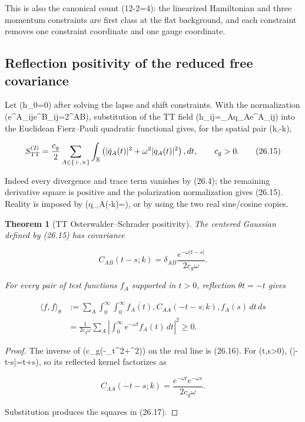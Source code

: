 \documentclass[11pt]{article}
\newtheorem{theorem}{Theorem}[section]
\theoremstyle{remark}
\begin{document}
This is also the canonical count
(12-2=4): the linearized Hamiltonian and three momentum
constraints are first class at the flat background, and each constraint
removes one constraint coordinate and one gauge coordinate.

\subsection{Reflection positivity of the reduced free covariance}

Let (h_{0\mu}=0) after solving the lapse and shift constraints.  With
the normalization (e^A_{ij}e^B_{ij}=2\delta^{AB}), substitution of the
TT field (h_{ij}=\sum_Aq_Ae^A_{ij}) into the Euclidean Fierz--Pauli
quadratic functional gives, for the spatial pair (k,-k),

\[
 S^{(2)}_{\rm TT}
 =\frac{c_g}{2}\sum_{A\in\{+,\times\}}
   \int_{\mathbb R}
   \left(|\dot q_A(t)|^2+\omega^2|q_A(t)|^2\right),dt,
 \qquad c_g>0.                                                \tag{26.15}
\]

Indeed every divergence and trace term vanishes by (26.4); the remaining
derivative square is positive and the polarization normalization gives
(26.15).  Reality is imposed by (q_A(-k)=), or by using
the two real sine/cosine copies.

\begin{theorem}[TT Osterwalder--Schrader positivity]
\label{thm:v19v23-os}
The centered Gaussian defined by (26.15) has covariance

\[
 C_{AB}(t-s;k)
 =\delta_{AB}\frac{e^{-\omega|t-s|}}{2c_g\omega}.             \tag{26.16}
\]

For every pair of test functions \(f_A\) supported in \(t>0\), reflection
\(\theta t=-t\) gives

\[
 \begin{split}
 \langle f,f\rangle_\theta
 &:={\sum_A}\int_0^\infty\!\!\int_0^\infty
 \overline{f_A(t)},C_{AA}(-t-s;k),f_A(s)\,dt\,ds\\
 &=\frac1{2c_g\omega}\sum_A
 \left|\int_0^\infty e^{-\omega t}f_A(t)\,dt\right|^2
 \geq0.                                                       \tag{26.17}
 \end{split}
\]
\end{theorem}

\begin{proof}
The inverse of (c_g(-\partial_t^2+\omega^2)) on the real line is
(26.16).  For (t,s>0),
(|-t-s|=t+s), so its reflected kernel factorizes as

\[
 C_{AA}(-t-s;k)
 =\frac{e^{-\omega t}e^{-\omega s}}{2c_g\omega}.              \tag{26.18}
\]

Substitution produces the squares in (26.17).
\end{proof}
\end{document}
